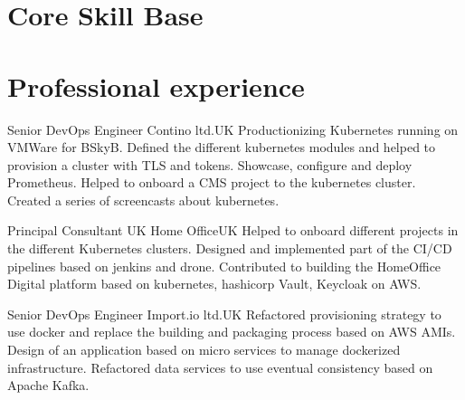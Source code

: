 \documentclass[10pt, a4paper]{moderncv}
\begin{document}
\maketitle


%
%

\section{Core Skill Base}




\cvline{}{}

\section{Professional experience}

{Senior DevOps Engineer}
{Contino ltd.}{UK}{}
{Productionizing Kubernetes running on VMWare for BSkyB.
Defined the different kubernetes modules and helped to
provision a cluster with TLS and tokens.
Showcase, configure and deploy Prometheus.
Helped to onboard a CMS project to the kubernetes cluster.
Created a series of screencasts about kubernetes.
\\}

\cvline{}{}

{Principal Consultant}
{UK Home Office}{UK}{}
{Helped to onboard different projects in the different Kubernetes clusters.
Designed and implemented part of the CI/CD pipelines based on jenkins and drone.
Contributed to building the HomeOffice Digital platform based on kubernetes,
hashicorp Vault, Keycloak on AWS.\\}

\cvline{}{}

{Senior DevOps Engineer}
{Import.io ltd.}{UK}{}
{Refactored provisioning strategy to use docker and replace the building and
packaging process based on AWS AMIs.
Design of an application based on micro services to manage dockerized infrastructure.
Refactored data services to use eventual consistency based on Apache Kafka.\\}
\end{document}
